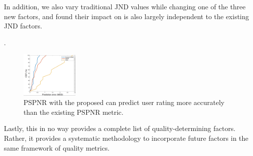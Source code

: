 In addition, we also vary traditional JND values while changing one of the three new factors, and found their impact on \vrjnd is also largely independent to the existing JND factors.


.

\begin{figure}
  \centering
  \includegraphics[width=0.25\textwidth]{images/mos-pspnr-psnr.pdf}
  \caption{PSPNR with the proposed \vrjnd can predict user rating more accurately than the  existing PSPNR metric.}
  \label{fig:pspnr-accuracy}
 \end{figure}

Lastly, this in no way provides a complete list of quality-determining factors. 
Rather, it provides a systematic methodology to incorporate future factors in the same framework of \vrvideo quality metrics.








